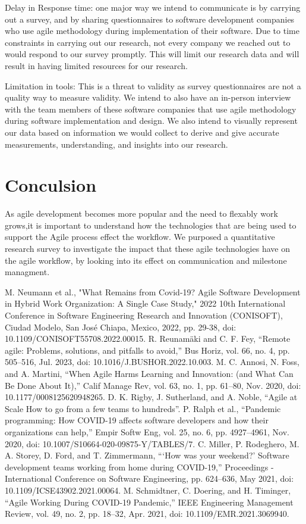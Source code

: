 \documentclass[conference]{IEEEtran}
\begin{document}
Delay in Response time: one major way we intend to communicate is by carrying out a survey, and by sharing questionnaires to software development companies who use agile methodology during implementation of their software. Due to time constraints in carrying out our research, not every company we reached out to would respond to our survey promptly. This will limit our research data and will result in having limited resources for our research.

Limitation in tools: This is a threat to validity as survey questionnaires are not a quality way to measure validity. We intend to also have an in-person interview with the team members of these software companies that use agile methodology during software implementation and design. We also intend to visually represent our data based on information we would collect to derive and give accurate measurements, understanding, and insights into our research.
\section{Conculsion}

As agile development becomes more popular and the need to flexably work grows,it is important to understand how the technologies that are being used to support the Agile process effect the workflow.
We purposed a quantitative research survey to investigate the impact that these agile technologies have on the agile workflow, by looking into its effect on communication and milestone managment. 


\begin{thebibliography}{00}
     M. Neumann et al., "What Remains from Covid-19? Agile Software Development in Hybrid Work Organization: A Single Case Study," 2022 10th International Conference in Software Engineering Research and Innovation (CONISOFT), Ciudad Modelo, San José Chiapa, Mexico, 2022, pp. 29-38, doi: 10.1109/CONISOFT55708.2022.00015.
     R. Reunamäki and C. F. Fey, “Remote agile: Problems, solutions, and pitfalls to avoid,” Bus Horiz, vol. 66, no. 4, pp. 505–516, Jul. 2023, doi: 10.1016/J.BUSHOR.2022.10.003. 
     M. C. Annosi, N. Foss, and A. Martini, “When Agile Harms Learning and Innovation: (and What Can Be Done About It),” Calif Manage Rev, vol. 63, no. 1, pp. 61–80, Nov. 2020, doi: 10.1177/0008125620948265. 
     D. K. Rigby, J. Sutherland, and A. Noble, “Agile at Scale How to go from a few teams to hundreds”.
     P. Ralph et al., “Pandemic programming: How COVID-19 affects software developers and how their organizations can help,” Empir Softw Eng, vol. 25, no. 6, pp. 4927–4961, Nov. 2020, doi: 10.1007/S10664-020-09875-Y/TABLES/7.
     C. Miller, P. Rodeghero, M. A. Storey, D. Ford, and T. Zimmermann, “‘How was your weekend?’ Software development teams working from home during COVID-19,” Proceedings - International Conference on Software Engineering, pp. 624–636, May 2021, doi: 10.1109/ICSE43902.2021.00064. 
     M. Schmidtner, C. Doering, and H. Timinger, “Agile Working During COVID-19 Pandemic,” IEEE Engineering Management Review, vol. 49, no. 2, pp. 18–32, Apr. 2021, doi: 10.1109/EMR.2021.3069940.
\end{thebibliography}
\end{document}
